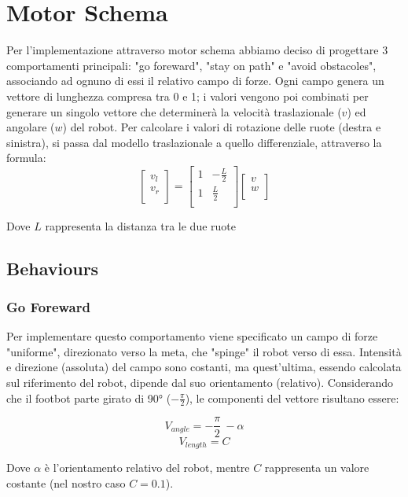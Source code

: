 \documentclass[UTF8]{article}
\begin{document}
\section{Motor Schema}
 Per l'implementazione attraverso motor schema abbiamo deciso di progettare 3 comportamenti principali: "go foreward", "stay on path" e "avoid obstacoles", associando ad ognuno di essi il relativo campo di forze.
 Ogni campo genera un vettore di lunghezza compresa tra 0 e 1; i valori vengono poi combinati per generare un singolo vettore che determinerà la  velocità traslazionale ($v$) ed angolare ($w$) del robot.
 Per calcolare i valori di rotazione delle ruote (destra e sinistra), si passa dal modello traslazionale a quello differenziale, attraverso la formula:
\[
\begin{bmatrix}
v_{l}\\ 
v_{r}\\
\end{bmatrix}
=
\begin{bmatrix}
1 & -\frac{L}{2} \\ 
1 & \frac{L}{2}\\
\end{bmatrix}
\begin{bmatrix}
v\\ 
w\\
\end{bmatrix}\]

Dove $L$ rappresenta la distanza tra le due ruote


 \subsection{Behaviours}
 \subsubsection{Go Foreward}
 Per implementare questo comportamento viene specificato un campo di forze "uniforme", direzionato verso la meta, che "spinge" il robot verso di essa.
 Intensità e direzione (assoluta) del campo sono costanti, ma quest'ultima, essendo calcolata sul riferimento del robot, dipende dal suo orientamento (relativo).
 Considerando che il footbot parte girato di 90° ($ -\frac{\pi}{2}$), le componenti del vettore risultano essere:

\[V_{angle} =  -\frac{\pi}{2}\ - \alpha\]
\[V_{length} = C\]

Dove $\alpha$ è l'orientamento relativo del robot, mentre
$C$ rappresenta un valore costante (nel nostro caso $C=0.1$).
\end{document}
